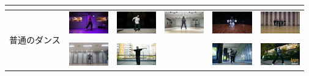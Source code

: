 \begin{table}[t]
\begin{center}
\begin{tabular}{|c|c|c|c|c|c|}
      \\ \cline{2-6}
        & \cite{thai} & \cite{jpn2} & & \cite{chinagroup} & \cite{belly}
      \\ \hline
      \multirow{4}{*}{普通のダンス}
        & \includegraphics[width=17mm]{images/snaps/ariana_dance.png}
        & \includegraphics[width=17mm]{images/snaps/kadokawa_dream_dance.png}
        & \includegraphics[width=17mm]{images/snaps/bts_dance.png}
        & \includegraphics[width=17mm]{images/snaps/bts_group_dance.png}
        & \includegraphics[width=17mm]{images/snaps/arashi_group_dance.png}
      \\ \cline{2-6}
        & \cite{ariana} & \cite{kadokawa} & \cite{bts} & \cite{btsgroup} & \cite{arashi}
      \\ \cline{2-6}
        & \includegraphics[width=17mm]{images/snaps/manolo_dance.png}
        & \includegraphics[width=17mm]{images/snaps/aito_dance.png}
        &
        & \includegraphics[width=17mm]{images/snaps/hyoga_dance.png}
        & \includegraphics[width=17mm]{images/snaps/legit_dance.png}
      \\ \cline{2-6}

\end{tabular}
\end{center}
\end{table}
